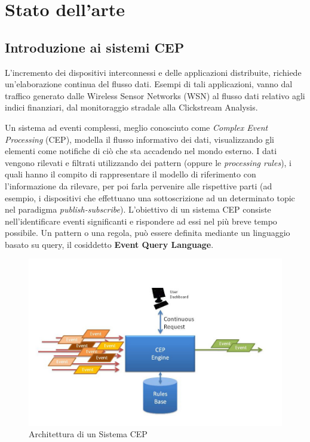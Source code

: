 \documentclass[12pt]{article}
\begin{document}
\section{Stato dell'arte}

\subsection{Introduzione ai sistemi CEP}
L'incremento dei dispositivi interconnessi e delle applicazioni distribuite, richiede un'elaborazione continua del flusso dati. Esempi di tali applicazioni, vanno dal traffico generato dalle Wireless Sensor Networks (WSN) al flusso dati relativo agli indici finanziari, dal monitoraggio stradale alla Clickstream Analysis. 

Un sistema ad eventi complessi, meglio conosciuto come \textit{Complex Event Processing} (CEP), modella il flusso informativo dei dati, visualizzando gli elementi come notifiche di ciò che sta accadendo nel mondo esterno. I dati vengono rilevati e filtrati utilizzando dei pattern (oppure le \textit{processing rules}), i quali hanno il compito di rappresentare il modello di riferimento con l'informazione da rilevare, per poi farla pervenire alle rispettive parti (ad esempio, i dispositivi che effettuano una sottoscrizione ad un determinato topic nel paradigma \textit{publish-subscribe}). L'obiettivo di un sistema CEP consiste nell'identificare eventi significanti e rispondere ad essi nel più breve tempo possibile.
Un pattern o una regola, può essere definita mediante un linguaggio basato su query, il cosiddetto \textbf{Event Query
	Language}.
\begin{figure}[H]
	\centering
	\includegraphics[scale=0.50]{images/CEP2.jpg}
	\caption{Architettura di un Sistema CEP\cite{cepimage}}
	\label{archcep}
\end{figure}
\end{document}
